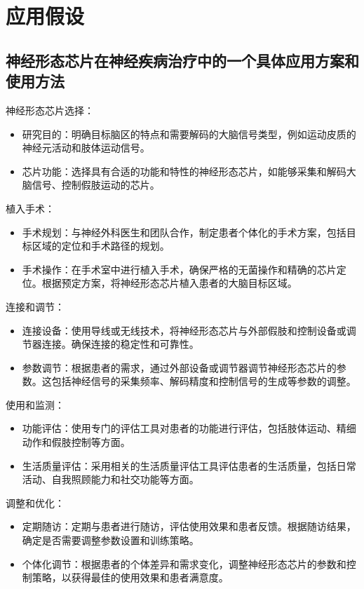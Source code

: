 \documentclass{thuemp}
\begin{document}
\section{应用假设}
\subsection{神经形态芯片在神经疾病治疗中的一个具体应用方案和使用方法}
{\heiti 神经形态芯片选择：}
\begin{itemize}
	\item 研究目的：明确目标脑区的特点和需要解码的大脑信号类型，例如运动皮质的神经元活动和肢体运动信号。
	\item 芯片功能：选择具有合适的功能和特性的神经形态芯片，如能够采集和解码大脑信号、控制假肢运动的芯片。
\end{itemize}

{\heiti 植入手术：}
\begin{itemize}
	\item 手术规划：与神经外科医生和团队合作，制定患者个体化的手术方案，包括目标区域的定位和手术路径的规划。
	\item 手术操作：在手术室中进行植入手术，确保严格的无菌操作和精确的芯片定位。根据预定方案，将神经形态芯片植入患者的大脑目标区域。
\end{itemize}

{\heiti 连接和调节：}
\begin{itemize}
	\item 连接设备：使用导线或无线技术，将神经形态芯片与外部假肢和控制设备或调节器连接。确保连接的稳定性和可靠性。
	\item 参数调节：根据患者的需求，通过外部设备或调节器调节神经形态芯片的参数。这包括神经信号的采集频率、解码精度和控制信号的生成等参数的调整。
\end{itemize}

{\heiti 使用和监测：}
\begin{itemize}
	\item 功能评估：使用专门的评估工具对患者的功能进行评估，包括肢体运动、精细动作和假肢控制等方面。
	\item 生活质量评估：采用相关的生活质量评估工具评估患者的生活质量，包括日常活动、自我照顾能力和社交功能等方面。
\end{itemize}

{\heiti 调整和优化：}
\begin{itemize}
	\item 定期随访：定期与患者进行随访，评估使用效果和患者反馈。根据随访结果，确定是否需要调整参数设置和训练策略。
	\item 个体化调节：根据患者的个体差异和需求变化，调整神经形态芯片的参数和控制策略，以获得最佳的使用效果和患者满意度。
\end{itemize}
\end{document}
